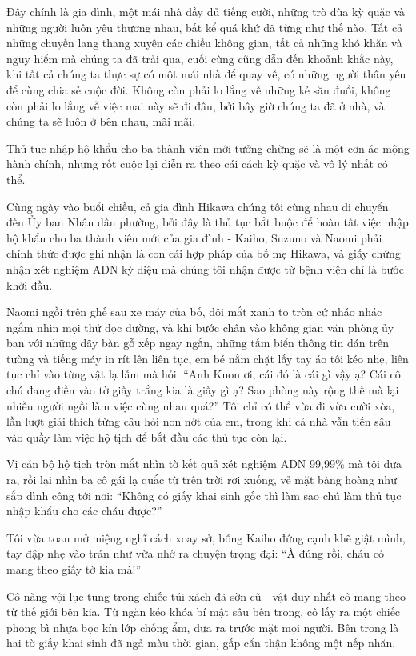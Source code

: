 ﻿\documentclass[../main.tex]{subfiles}
\begin{document}
Đây chính là gia đình, một mái nhà đầy đủ tiếng cười, những trò đùa kỳ quặc và những người luôn yêu thương nhau, bất kể quá khứ đã từng như thế nào. Tất cả những chuyến lang thang xuyên các chiều không gian, tất cả những khó khăn và nguy hiểm mà chúng ta đã trải qua, cuối cùng cũng dẫn đến khoảnh khắc này, khi tất cả chúng ta thực sự có một mái nhà để quay về, có những người thân yêu để cùng chia sẻ cuộc đời. Không còn phải lo lắng về những kẻ săn đuổi, không còn phải lo lắng về việc mai này sẽ đi đâu, bởi bây giờ chúng ta đã ở nhà, và chúng ta sẽ luôn ở bên nhau, mãi mãi.

\ct

Thủ tục nhập hộ khẩu cho ba thành viên mới tưởng chừng sẽ là một cơn ác mộng hành chính, nhưng rốt cuộc lại diễn ra theo cái cách kỳ quặc và vô lý nhất có thể.

Cùng ngày vào buổi chiều, cả gia đình Hikawa chúng tôi cùng nhau di chuyển đến Ủy ban Nhân dân phường, bởi đây là thủ tục bắt buộc để hoàn tất việc nhập hộ khẩu cho ba thành viên mới của gia đình - Kaiho, Suzuno và Naomi phải chính thức được ghi nhận là con cái hợp pháp của bố mẹ Hikawa, và giấy chứng nhận xét nghiệm ADN kỳ diệu mà chúng tôi nhận được từ bệnh viện chỉ là bước khởi đầu.

Naomi ngồi trên ghế sau xe máy của bố, đôi mắt xanh to tròn cứ nháo nhác ngắm nhìn mọi thứ dọc đường, và khi bước chân vào không gian văn phòng ủy ban với những dãy bàn gỗ xếp ngay ngắn, những tấm biển thông tin dán trên tường và tiếng máy in rít lên liên tục, em bé nắm chặt lấy tay áo tôi kéo nhẹ, liên tục chỉ vào từng vật lạ lẫm mà hỏi: ``Anh Kuon ơi, cái đó là cái gì vậy ạ? Cái cô chú đang điền vào tờ giấy trắng kia là giấy gì ạ? Sao phòng này rộng thế mà lại nhiều người ngồi làm việc cùng nhau quá?'' Tôi chỉ có thể vừa đi vừa cười xòa, lần lượt giải thích từng câu hỏi non nớt của em, trong khi cả nhà vẫn tiến sâu vào quầy làm việc hộ tịch để bắt đầu các thủ tục còn lại.

Vị cán bộ hộ tịch tròn mắt nhìn tờ kết quả xét nghiệm ADN 99,99\% mà tôi đưa ra, rồi lại nhìn ba cô gái lạ quắc từ trên trời rơi xuống, vẻ mặt bàng hoàng như sắp đình công tới nơi: ``Không có giấy khai sinh gốc thì làm sao chú làm thủ tục nhập khẩu cho các cháu được?''

Tôi vừa toan mở miệng nghĩ cách xoay sở, bỗng Kaiho đứng cạnh khẽ giật mình, tay đập nhẹ vào trán như vừa nhớ ra chuyện trọng đại: ``À đúng rồi, cháu có mang theo giấy tờ kia mà!''

Cô nàng vội lục tung trong chiếc túi xách đã sờn cũ - vật duy nhất cô mang theo từ thế giới bên kia. Từ ngăn kéo khóa bí mật sâu bên trong, cô lấy ra một chiếc phong bì nhựa bọc kín lớp chống ẩm, đưa ra trước mặt mọi người. Bên trong là hai tờ giấy khai sinh đã ngả màu thời gian, gấp cẩn thận không một nếp nhăn.
\end{document}
